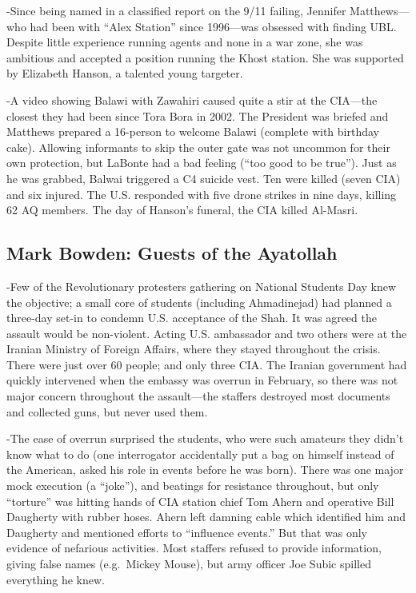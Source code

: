 \documentclass[
]{article}
\begin{document}
-Since being named in a classified report on the 9/11 failing, Jennifer
Matthews---who had been with ``Alex Station'' since 1996---was obsessed
with finding UBL. Despite little experience running agents and none in a
war zone, she was ambitious and accepted a position running the Khost
station. She was supported by Elizabeth Hanson, a talented young
targeter.

-A video showing Balawi with Zawahiri caused quite a stir at the
CIA---the closest they had been since Tora Bora in 2002. The President
was briefed and Matthews prepared a 16-person to welcome Balawi
(complete with birthday cake). Allowing informants to skip the outer
gate was not uncommon for their own protection, but LaBonte had a bad
feeling (``too good to be true''). Just as he was grabbed, Balwai
triggered a C4 suicide vest. Ten were killed (seven CIA) and six
injured. The U.S. responded with five drone strikes in nine days,
killing 62 AQ members. The day of Hanson's funeral, the CIA killed
Al-Masri.

\hypertarget{mark-bowden-guests-of-the-ayatollah}{%
\subsection{Mark Bowden: Guests of the
Ayatollah}\label{mark-bowden-guests-of-the-ayatollah}}

-Few of the Revolutionary protesters gathering on National Students Day
knew the objective; a small core of students (including Ahmadinejad) had
planned a three-day set-in to condemn U.S. acceptance of the Shah. It
was agreed the assault would be non-violent. Acting U.S. ambassador and
two others were at the Iranian Ministry of Foreign Affairs, where they
stayed throughout the crisis. There were just over 60 people; and only
three CIA. The Iranian government had quickly intervened when the
embassy was overrun in February, so there was not major concern
throughout the assault---the staffers destroyed most documents and
collected guns, but never used them.

-The ease of overrun surprised the students, who were such amateurs they
didn't know what to do (one interrogator accidentally put a bag on
himself instead of the American, asked his role in events before he was
born). There was one major mock execution (a ``joke''), and beatings for
resistance throughout, but only ``torture'' was hitting hands of CIA
station chief Tom Ahern and operative Bill Daugherty with rubber hoses.
Ahern left damning cable which identified him and Daugherty and
mentioned efforts to ``influence events.'' But that was only evidence of
nefarious activities. Most staffers refused to provide information,
giving false names (e.g.~Mickey Mouse), but army officer Joe Subic
spilled everything he knew.
\end{document}
